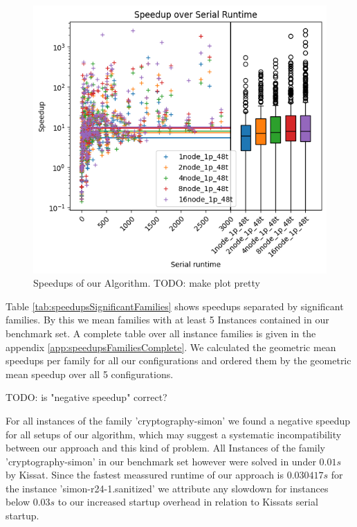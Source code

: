\documentclass[12pt,a4paper,twoside]{scrartcl}
\numberwithin{equation}{section}
\begin{document}
\begin{figure}
  \center
  \includegraphics{plots/speedups_gim.png}
  \caption{Speedups of our Algorithm. TODO: make plot pretty}
  \label{fig:speedups}
\end{figure}


Table \ref{tab:speedupsSignificantFamilies} shows speedups separated by significant families. By this we mean families with at least 5 Instances contained in our benchmark set. A complete table over all instance families is given in the appendix \ref{app:speedupsFamiliesComplete}. We calculated the geometric mean speedups per family for all our configurations and ordered them by the geometric mean speedup over all 5 configurations.

TODO: is "negative speedup" correct?

For all instances of the family 'cryptography-simon' we found a negative speedup for all setups of our algorithm, which may suggest a systematic incompatibility between our approach and this kind of problem. All Instances of the family 'cryptography-simon' in our benchmark set however were solved in under $0.01s$ by Kissat. Since the fastest meassured runtime of our approach is $0.030417s$ for the instance 'simon-r24-1.sanitized' we attribute any slowdown for instances below $0.03s$ to our increased startup overhead in relation to Kissats serial startup.
\end{document}
